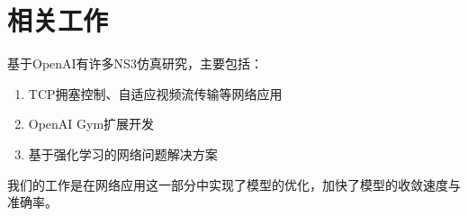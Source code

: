 
\section{相关工作}

基于OpenAI有许多NS3仿真研究，主要包括：

\begin{enumerate}
\item TCP拥塞控制、自适应视频流传输等网络应用
\item OpenAI Gym扩展开发
\item 基于强化学习的网络问题解决方案
\end{enumerate}

我们的工作是在网络应用这一部分中实现了模型的优化，加快了模型的收敛速度与准确率。